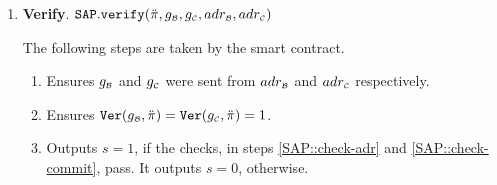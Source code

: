 \begin{enumerate}
        \vspace{1mm}
   
 \item\textbf{Verify}. $\mathtt{SAP.verify}(\ddot{\pi}, g_{\scriptscriptstyle\mathcal B},g_{\scriptscriptstyle\mathcal C}, adr_{\scriptscriptstyle\mathcal{B}}, adr_{\scriptscriptstyle\mathcal{C}})$
 
 
 The following steps are taken   by  the smart contract.
   \begin{enumerate}
   
\item\label{SAP::check-adr} Ensures $g_{\scriptscriptstyle\mathcal B}$ and $g_{\scriptscriptstyle\mathcal C}$ were sent from   $adr_{\scriptscriptstyle \mathcal{B}}$ and  $adr_{\scriptscriptstyle \mathcal{C}}$  respectively. 
  
   \item\label{SAP::check-commit} Ensures $\mathtt{Ver}(g_{\scriptscriptstyle\mathcal B},\ddot{\pi})=\mathtt{Ver}(g_{\scriptscriptstyle\mathcal C},\ddot{\pi}) =1$.
   
   \item Outputs $s=1$, if the checks, in steps \ref{SAP::check-adr} and \ref{SAP::check-commit}, pass. It outputs $s=0$, otherwise.
    \end{enumerate}
 \end{enumerate}

  
  
  
  
%



